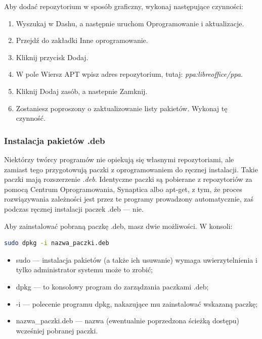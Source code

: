 Aby dodać repozytorium w sposób graficzny, wykonaj następujące czynności:
\begin{enumerate}
\item Wyszukaj w Dashu, a następnie uruchom \textcolor{ubuntu_orange}{Oprogramowanie i aktualizacje}.
\item Przejdź do zakładki \textcolor{ubuntu_orange}{Inne oprogramowanie}.
\item Kliknij przycisk \textcolor{ubuntu_orange}{Dodaj}.
\item W pole \textcolor{ubuntu_orange}{Wiersz APT} wpisz adres repozytorium, tutaj: \textit{ppa:libreoffice/ppa}.
\item Kliknij \textcolor{ubuntu_orange}{Dodaj zasób}, a nastepnie \textcolor{ubuntu_orange}{Zamknij}.
\item Zostaniesz poproszony o zaktualizowanie listy pakietów. Wykonaj tę czynność.
\end{enumerate}

\subsubsection{Instalacja pakietów .deb}
Niektórzy twórcy programów nie opiekują się własnymi repozytoriami, ale zamiast tego przygotowują paczki z oprogramowaniem do ręcznej instalacji. Takie paczki mają rozszerzenie \textit{.deb}. Identyczne paczki są pobierane z repozytoriów za pomocą Centrum Oprogramowania, Synaptica albo apt-get, z tym, że proces rozwiązywania zależności jest przez te programy prowadzony automatycznie, zaś podczas ręcznej instalacji paczek .deb --- nie.

Aby zainstalować pobraną paczkę .deb, masz dwie możliwości. W konsoli:
\begin{lstlisting}[language=bash]
sudo dpkg -i nazwa_paczki.deb
\end{lstlisting}
\begin{itemize}
\item \textcolor{ubuntu_orange}{sudo} --- instalacja pakietów (a także ich usuwanie) wymaga uwierzytelnienia i tylko administrator systemu może to zrobić;
\item \textcolor{ubuntu_orange}{dpkg} --- to konsolowy program do zarządzania paczkami .deb;
\item \textcolor{ubuntu_orange}{-i} --- polecenie programu dpkg, nakazujące mu zainstalować wskazaną paczkę;
\item \textcolor{ubuntu_orange}{nazwa\_paczki.deb} --- nazwa (ewentualnie poprzedzona ścieżką dostępu) wcześniej pobranej paczki.
\end{itemize}

